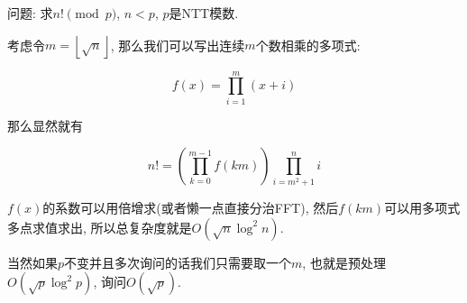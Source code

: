 问题: 求$n! \pmod p$, $n < p$, $p$是NTT模数.

考虑令$m = \left\lfloor \sqrt n \right\rfloor$, 那么我们可以写出连续$m$个数相乘的多项式:

$$ f(x) = \prod_{i = 1} ^ m (x + i) $$

那么显然就有

$$ n! = \left( \prod_{k = 0} ^ {m - 1} f(k m) \right) \prod_{i = m ^ 2 + 1} ^ n i $$

$f(x)$的系数可以用倍增求(或者懒一点直接分治FFT), 然后$f(km)$可以用多项式多点求值求出, 所以总复杂度就是$O(\sqrt n \log^2 n)$.

当然如果$p$不变并且多次询问的话我们只需要取一个$m$, 也就是预处理$O(\sqrt p \log^2 p)$, 询问$O(\sqrt p)$.